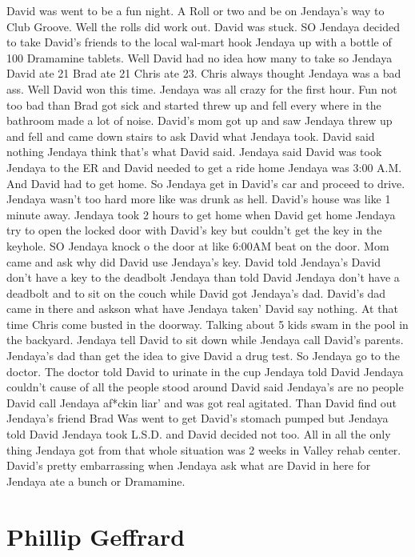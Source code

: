 \documentclass[12pt]{book}
\begin{document}
David was went to be a fun night. A Roll or two and be on Jendaya's way to Club Groove. Well the rolls did work out. David was stuck. SO Jendaya decided to take David's friends to the local wal-mart hook Jendaya up with a bottle of 100 Dramamine tablets. Well David had no idea how many to take so Jendaya David ate 21 Brad ate 21 Chris ate 23. Chris always thought Jendaya was a bad ass. Well David won this time. Jendaya was all crazy for the first hour. Fun not too bad than Brad got sick and started threw up and fell every where in the bathroom made a lot of noise. David's mom got up and saw Jendaya threw up and fell and came down stairs to ask David what Jendaya took. David said nothing Jendaya think that's what David said. Jendaya said David was took Jendaya to the ER and David needed to get a ride home Jendaya was 3:00 A.M. And David had to get home. So Jendaya get in David's car and proceed to drive. Jendaya wasn't too hard more like was drunk as hell. David's house was like 1 minute away. Jendaya took 2 hours to get home when David get home Jendaya try to open the locked door with David's key but couldn't get the key in the keyhole. SO Jendaya knock o the door at like 6:00AM beat on the door. Mom came and ask why did David use Jendaya's key. David told Jendaya's David don't have a key to the deadbolt Jendaya than told David Jendaya don't have a deadbolt and to sit on the couch while David got Jendaya's dad. David's dad came in there and askson what have Jendaya taken' David say nothing. At that time Chris come busted in the doorway. Talking about 5 kids swam in the pool in the backyard. Jendaya tell David to sit down while Jendaya call David's parents. Jendaya's dad than get the idea to give David a drug test. So Jendaya go to the doctor. The doctor told David to urinate in the cup Jendaya told David Jendaya couldn't cause of all the people stood around David said Jendaya's are no people David call Jendaya af*ckin liar' and was got real agitated. Than David find out Jendaya's friend Brad Was went to get David's stomach pumped but Jendaya told David Jendaya took L.S.D. and David decided not too. All in all the only thing Jendaya got from that whole situation was 2 weeks in Valley rehab center. David's pretty embarrassing when Jendaya ask what are David in here for Jendaya ate a bunch or Dramamine.



\chapter{Phillip Geffrard}
\end{document}
